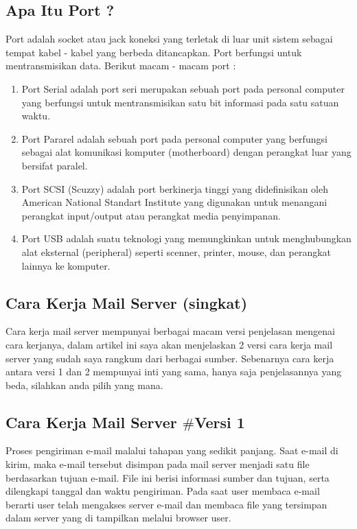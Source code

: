 \subsection {Apa Itu Port ?} \par
Port adalah socket atau jack koneksi yang terletak di luar unit sistem sebagai tempat kabel - kabel yang berbeda ditancapkan. Port berfungsi untuk mentransmisikan data. Berikut macam - macam port : \par
\noindent 
\begin{enumerate}
\item Port Serial adalah port seri merupakan sebuah port pada personal computer yang berfungsi untuk mentransmisikan satu bit informasi pada satu satuan waktu. \par
\noindent 
\item Port Pararel adalah sebuah port pada personal computer yang berfungsi sebagai alat komunikasi komputer (motherboard) dengan perangkat luar yang bersifat paralel. \par
\noindent 
\item Port SCSI (Scuzzy) adalah port berkinerja tinggi yang didefinisikan oleh American National Standart Institute yang digunakan untuk menangani perangkat input/output atau perangkat media penyimpanan. \par
\noindent 
\item Port USB adalah suatu teknologi yang memungkinkan untuk menghubungkan alat eksternal (peripheral) seperti scenner, printer, mouse, dan perangkat lainnya ke komputer. \par
\end{enumerate}
\vspace{12pt}
\noindent 
\subsection {Cara Kerja Mail Server (singkat)} \par
Cara kerja mail server mempunyai berbagai macam versi penjelasan mengenai cara kerjanya, dalam artikel ini saya akan menjelaskan 2 versi cara kerja mail server yang sudah saya rangkum dari berbagai sumber. Sebenarnya cara kerja antara versi 1 dan 2 mempunyai inti yang sama, hanya saja penjelasannya yang beda, silahkan anda pilih yang mana. \par
\vspace{12pt}
\noindent 
\subsection {Cara Kerja Mail Server  $  \#  $Versi 1} \par
Proses pengiriman e-mail malalui tahapan yang sedikit panjang. Saat e-mail di kirim, maka e-mail tersebut disimpan pada mail server menjadi satu file berdasarkan tujuan e-mail. File ini berisi informasi sumber dan tujuan, serta dilengkapi tanggal dan waktu pengiriman. Pada saat user membaca e-mail berarti user telah mengakses server e-mail dan membaca file yang tersimpan dalam server yang di tampilkan melalui browser user. \par
\vspace{12pt}
\noindent 
